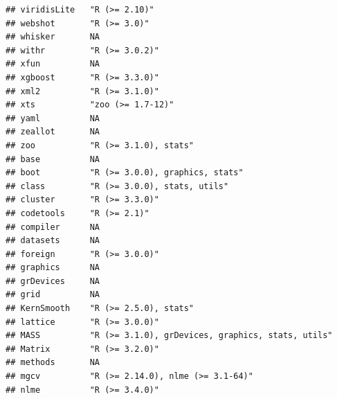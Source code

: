 \documentclass[]{article}
\begin{document}
\begin{verbatim}
## viridisLite   "R (>= 2.10)"                                                            
## webshot       "R (>= 3.0)"                                                             
## whisker       NA                                                                       
## withr         "R (>= 3.0.2)"                                                           
## xfun          NA                                                                       
## xgboost       "R (>= 3.3.0)"                                                           
## xml2          "R (>= 3.1.0)"                                                           
## xts           "zoo (>= 1.7-12)"                                                        
## yaml          NA                                                                       
## zeallot       NA                                                                       
## zoo           "R (>= 3.1.0), stats"                                                    
## base          NA                                                                       
## boot          "R (>= 3.0.0), graphics, stats"                                          
## class         "R (>= 3.0.0), stats, utils"                                             
## cluster       "R (>= 3.3.0)"                                                           
## codetools     "R (>= 2.1)"                                                             
## compiler      NA                                                                       
## datasets      NA                                                                       
## foreign       "R (>= 3.0.0)"                                                           
## graphics      NA                                                                       
## grDevices     NA                                                                       
## grid          NA                                                                       
## KernSmooth    "R (>= 2.5.0), stats"                                                    
## lattice       "R (>= 3.0.0)"                                                           
## MASS          "R (>= 3.1.0), grDevices, graphics, stats, utils"                        
## Matrix        "R (>= 3.2.0)"                                                           
## methods       NA                                                                       
## mgcv          "R (>= 2.14.0), nlme (>= 3.1-64)"                                        
## nlme          "R (>= 3.4.0)"                                                           

\end{verbatim}
\end{document}

